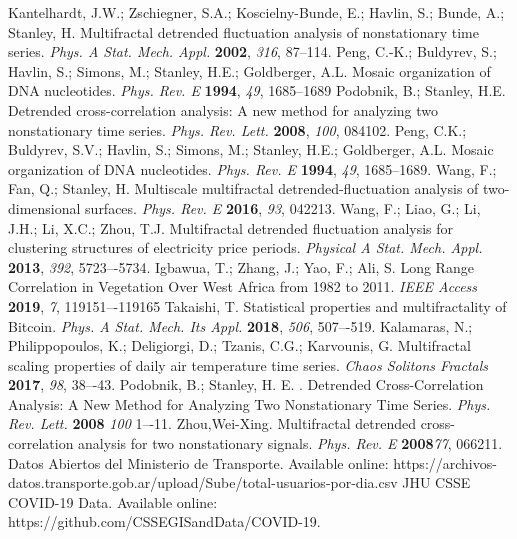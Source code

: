 \documentclass[onecolumn, preprint,aps,amsmath, amssymb, superscriptaddress]{revtex4}
\begin{document}
\begin{thebibliography}{99}
Kantelhardt, J.W.; Zschiegner, S.A.; Koscielny-Bunde, E.; Havlin, S.; Bunde, A.; Stanley, H. Multifractal detrended fluctuation analysis of nonstationary time series. {\em Phys. A Stat. Mech. Appl.} {\bf 2002}, {\em 316}, 87--114.
Peng, C.-K.; Buldyrev, S.; Havlin, S.; Simons, M.; Stanley, H.E.; Goldberger, A.L. Mosaic organization of DNA nucleotides. {\em Phys. Rev. E} {\bf 1994}, {\em 49}, 1685--1689
Podobnik, B.; Stanley, H.E. Detrended cross-correlation analysis: A new method for analyzing two nonstationary time series. {\em Phys. Rev. Lett.} {\bf 2008}, {\em 100}, 084102.
Peng, C.K.; Buldyrev, S.V.; Havlin, S.; Simons, M.; Stanley, H.E.; Goldberger, A.L. Mosaic organization of DNA nucleotides. {\em Phys. Rev. E} {\bf 1994}, {\em 49}, 1685--1689.
Wang, F.; Fan, Q.; Stanley, H. Multiscale multifractal detrended-fluctuation analysis of two-dimensional surfaces. {\em Phys. Rev. E} {\bf 2016}, {\em 93}, 042213.
Wang, F.; Liao, G.; Li, J.H.; Li, X.C.; Zhou, T.J. Multifractal detrended fluctuation analysis for clustering structures of electricity price periods. {\em Physical A Stat. Mech. Appl.} {\bf 2013}, {\em 392}, 5723–-5734.
Igbawua, T.; Zhang, J.; Yao, F.; Ali, S. Long Range Correlation in Vegetation Over West Africa from 1982 to 2011. {\em IEEE Access} {\bf 2019}, {\em 7}, 119151–-119165
Takaishi, T. Statistical properties and multifractality of Bitcoin. {\em Phys. A Stat. Mech. Its Appl.} {\bf 2018}, {\em 506}, 507–-519.
Kalamaras, N.; Philippopoulos, K.; Deligiorgi, D.; Tzanis, C.G.; Karvounis, G. Multifractal scaling properties of daily air temperature time series. {\em Chaos Solitons Fractals} {\bf 2017}, {\em 98}, 38–-43.
Podobnik, B.; Stanley, H. E. . Detrended Cross-Correlation Analysis: A New Method for Analyzing Two Nonstationary Time Series. {\em Phys. Rev. Lett.} {\bf 2008} {\em 100} 1–-11.
 Zhou,Wei-Xing. Multifractal detrended cross-correlation analysis for two nonstationary signals. {\em Phys. Rev. E} {\bf 2008}{\em 77}, 066211.
Datos Abiertos del Ministerio de Transporte. Available online: https://archivos-datos.transporte.gob.ar/upload/Sube/total-usuarios-por-dia.csv
JHU CSSE COVID-19 Data. Available online: https://github.com/CSSEGISandData/COVID-19.

\end{thebibliography}
\end{document}
